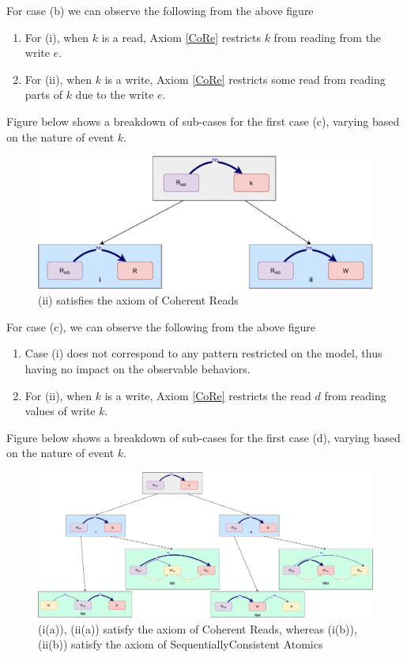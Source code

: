     For case (b) we can observe the following from the above figure 
    \begin{enumerate}
        \item For (i), when $k$ is a read, Axiom \ref{CoRe} restricts $k$ from reading from the write $e$. 
        \item For (ii), when $k$ is a write, Axiom \ref{CoRe} restricts some read from reading parts of $k$ due to the write $e$.   
    \end{enumerate}

    Figure below shows a breakdown of sub-cases for the first case (c), varying based
    on the nature of event $k$.
    \begin{figure}[H]
        \centering
        \includegraphics[scale=0.6]{InstructionReordering/ValidReorderingProof/ProofParts/Part4/part4(c).pdf}
        \caption{(ii) satisfies the axiom of Coherent Reads}
        \label{fig:my_label}
    \end{figure}
    
    For case (c), we can observe the following from the above figure
    \begin{enumerate}
        \item Case (i) does not correspond to any pattern restricted on the model, thus having no impact on the observable behaviors. 
        \item For (ii), when $k$ is a write, Axiom \ref{CoRe} restricts the read $d$ from reading values of write $k$. 
    \end{enumerate}

    Figure below shows a breakdown of sub-cases for the first case (d), varying based
    on the nature of event $k$.
    \begin{figure}[H]
        \centering
        \includegraphics[scale=0.4]{InstructionReordering/ValidReorderingProof/ProofParts/Part4/part4(d).pdf}
        \caption{(i(a)), (ii(a)) satisfy the axiom of Coherent Reads, whereas (i(b)), (ii(b)) satisfy the axiom of SequentiallyConsistent Atomics}
        \label{fig:my_label}
    \end{figure}


